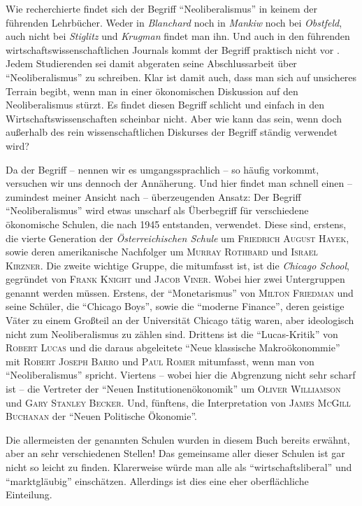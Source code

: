 Wie \textcite[S. 179]{Venugopal2015} recherchierte findet sich der Begriff "`Neoliberalismus"' in keinem der führenden Lehrbücher. Weder in \textit{Blanchard} noch in \textit{Mankiw} noch bei \textit{Obstfeld}, auch nicht bei \textit{Stiglitz} und \textit{Krugman} findet man ihn. Und auch in den führenden wirtschaftswissenschaftlichen Journals kommt der Begriff praktisch nicht vor \parencite[S. 179]{Venugopal2015}. Jedem Studierenden sei damit abgeraten seine Abschlussarbeit über "`Neoliberalismus"' zu schreiben. Klar ist damit auch, dass man sich auf unsicheres Terrain begibt, wenn man in einer ökonomischen Diskussion auf den Neoliberalismus stürzt. Es findet diesen Begriff schlicht und einfach in den Wirtschaftswissenschaften scheinbar nicht. Aber wie kann das sein, wenn doch außerhalb des rein wissenschaftlichen Diskurses der Begriff ständig verwendet wird?

Da der Begriff -- nennen wir es umgangssprachlich -- so häufig vorkommt, versuchen wir uns dennoch der Annäherung. Und hier findet man schnell einen -- zumindest meiner Ansicht nach -- überzeugenden Ansatz: Der Begriff "`Neoliberalismus"' wird etwas unscharf als Überbegriff für verschiedene ökonomische Schulen, die nach 1945 entstanden, verwendet. Diese sind, erstens, die vierte Generation der \textit{Österreichischen Schule} um \textsc{Friedrich August Hayek}, sowie deren amerikanische Nachfolger um \textsc{Murray Rothbard} und \textsc{Israel Kirzner}. Die zweite wichtige Gruppe, die mitumfasst ist, ist die \textit{Chicago School}, gegründet von \textsc{Frank Knight} und \textsc{Jacob Viner}. Wobei hier zwei Untergruppen genannt werden müssen. Erstens, der "`Monetarismus"' von \textsc{Milton Friedman} und seine Schüler, die "`Chicago Boys"', sowie die "`moderne Finance"', deren geistige Väter zu einem Großteil an der Universität Chicago tätig waren, aber ideologisch nicht zum Neoliberalismus zu zählen sind. Drittens ist die "`Lucas-Kritik"' von \textsc{Robert Lucas} und die daraus abgeleitete "`Neue klassische Makroökonommie"' mit \textsc{Robert Joseph Barro} und \textsc{Paul Romer}  mitumfasst, wenn man von "`Neoliberalismus"' spricht. Viertens -- wobei hier die Abgrenzung nicht sehr scharf ist -- die Vertreter der "`Neuen Institutionenökonomik"' um \textsc{Oliver Williamson} und \textsc{Gary Stanley Becker}. Und, fünftens, die Interpretation von \textsc{James McGill Buchanan} der  "`Neuen Politische Ökonomie"'.

Die allermeisten der genannten Schulen wurden in diesem Buch bereits erwähnt, aber an sehr verschiedenen Stellen! Das gemeinsame aller dieser Schulen ist gar nicht so leicht zu finden. Klarerweise würde man alle als "`wirtschaftsliberal"' und  "`marktgläubig"' einschätzen. Allerdings ist dies eine eher oberflächliche Einteilung.


